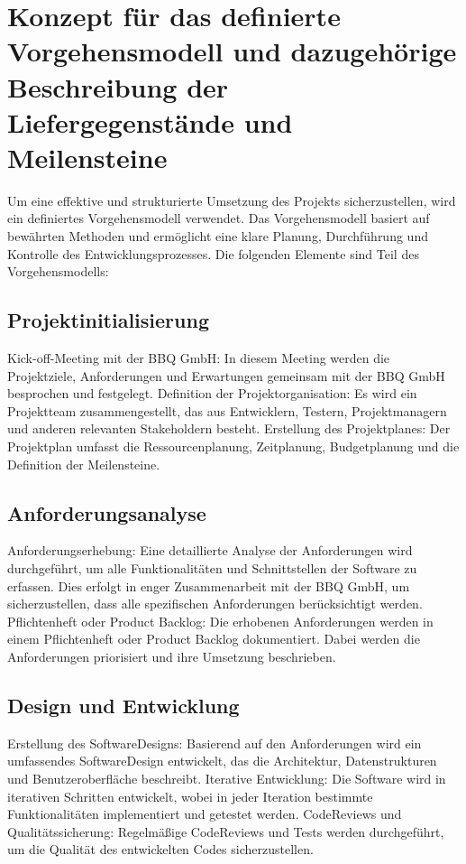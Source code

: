 \documentclass[12pt]{article}
\begin{document}
	
	\tableofcontents
	\newpage
	\thispagestyle{plain}
	
	
	\section{Konzept für das definierte Vorgehensmodell und dazugehörige Beschreibung der Liefergegenstände und Meilensteine}

	Um eine effektive und strukturierte Umsetzung des Projekts sicherzustellen, wird ein definiertes Vorgehensmodell verwendet. Das Vorgehensmodell basiert auf bewährten Methoden und ermöglicht eine klare Planung, Durchführung und Kontrolle des Entwicklungsprozesses. Die folgenden Elemente sind Teil des Vorgehensmodells:

	\subsection{Projektinitialisierung}
	Kick-off-Meeting mit der BBQ GmbH: In diesem Meeting werden die Projektziele, Anforderungen und Erwartungen gemeinsam mit der BBQ GmbH besprochen und festgelegt.
	Definition der Projektorganisation: Es wird ein Projektteam zusammengestellt, das aus Entwicklern, Testern, Projektmanagern und anderen relevanten Stakeholdern besteht.
	Erstellung des Projektplanes: Der Projektplan umfasst die Ressourcenplanung, Zeitplanung, Budgetplanung und die Definition der Meilensteine.

	\subsection{Anforderungsanalyse}
	Anforderungserhebung: Eine detaillierte Analyse der Anforderungen wird durchgeführt, um alle Funktionalitäten und Schnittstellen der Software zu erfassen. Dies erfolgt in enger Zusammenarbeit mit der BBQ GmbH, um sicherzustellen, dass alle spezifischen Anforderungen berücksichtigt werden.
	Pflichtenheft oder Product Backlog: Die erhobenen Anforderungen werden in einem Pflichtenheft oder Product Backlog dokumentiert. Dabei werden die Anforderungen priorisiert und ihre Umsetzung beschrieben.

	\subsection{Design und Entwicklung}
	Erstellung des SoftwareDesigns: Basierend auf den Anforderungen wird ein umfassendes SoftwareDesign entwickelt, das die Architektur, Datenstrukturen und Benutzeroberfläche beschreibt.
	Iterative Entwicklung: Die Software wird in iterativen Schritten entwickelt, wobei in jeder Iteration bestimmte Funktionalitäten implementiert und getestet werden.
	CodeReviews und Qualitätssicherung: Regelmäßige CodeReviews und Tests werden durchgeführt, um die Qualität des entwickelten Codes sicherzustellen.
\end{document}
